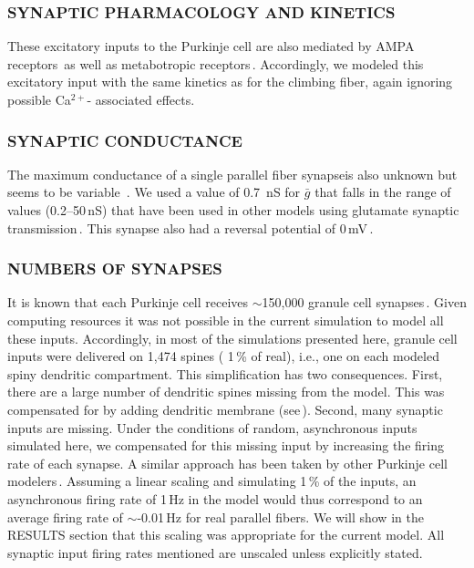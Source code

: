 \documentclass[12pt]{article}
\begin{document}
\subsubsection*{SYNAPTIC PHARMACOLOGY AND KINETICS}

These excitatory inputs to the Purkinje cell are also mediated by AMPA receptors\,\cite{Farrant:1991hc, Garthwaite:1989ij, Lambolez:1992bs} as well as metabotropic receptors\,\cite{Blackstone:1989fu, Glaum:1992kl, Vranesic:2qa}. Accordingly, we modeled this excitatory input with the same kinetics as for the climbing fiber, again ignoring possible Ca$^{2+}$- associated effects.

\subsubsection*{SYNAPTIC CONDUCTANCE}

The maximum conductance of a single parallel fiber synapseis also unknown but seems to be variable
\,\cite{Hirano:1986fv, Ito:1989dz}. We used a value of 0.7\, nS for $\bar g$ that falls in the range of values (0.2--50\,nS) that have been used in other models using glutamate synaptic transmission\,\cite{R:1989cr, W 1991qa, Miller:1985mi, Rapp-M:1992kx, Wehmeier:1989pi, Wilson:1989ff, Zador:1990lh}.  This synapse also had a reversal potential of 0\,mV\,\cite{Cull-Candy:1989oq, Mayer:1987kl}.

\subsubsection*{NUMBERS OF SYNAPSES}

It is known that each Purkinje cell receives $\sim$150,000 granule cell synapses\,\cite{Harvey:1991xz}. Given computing resources it was not possible in the current simulation to model all these inputs. Accordingly, in most
of the simulations presented here, granule cell inputs were delivered on 1,474 spines ( 1\,\% of real), i.e., one on each modeled spiny dendritic compartment. This simplification has two consequences. First, there are a large number of dendritic spines missing from the model. This was compensated for by adding dendritic membrane (see\,\cite{R:1989cr, Rapp-M:1992kx}). Second, many synaptic inputs are missing. Under the conditions of random, asynchronous inputs simulated here, we compensated for this missing  input by increasing the firing rate of each synapse. A similar approach has been taken by other Purkinje cell modelers\,\cite{Rapp-M:1992kx}. Assuming a linear scaling and simulating 1\,\% of the inputs, an asynchronous firing rate of 1\,Hz in the model would thus correspond to an average firing rate of $\sim$-0.01\,Hz for real parallel fibers. We will show in the RESULTS section that this scaling was appropriate for the current model. All synaptic input firing rates mentioned are unscaled unless explicitly stated.
\end{document}
